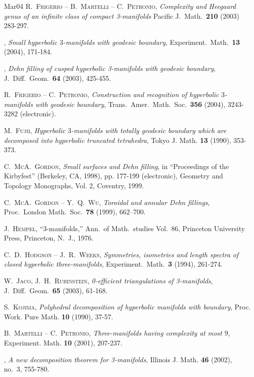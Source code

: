 \documentclass[10pt]{article}      %
\begin{document}
\begin{thebibliography}{Mar04}
 \textsc{R.~Frigerio -- B.~Martelli -- C.~Petronio},
\emph{Complexity and Heegaard genus of an infinite class of compact 3-manifolds}
Pacific J.~Math.~\textbf{210} (2003) 283-297.

 \bysame,
\emph{Small hyperbolic $3$-manifolds with geodesic boundary},
Experiment.~Math.~\textbf{13} (2004), 171-184.

 \bysame,
\emph{Dehn filling of cusped hyperbolic 3-manifolds with geodesic boundary},
J.~Diff.~Geom.~\textbf{64} (2003), 425-455.

 \textsc{R.~Frigerio -- C.~Petronio},
\emph{Construction and recognition of hyperbolic $3$-manifolds
with geodesic boundary},  
Trans.~Amer.~Math.~Soc.~\textbf{356} (2004), 3243-3282 (electronic).

\textsc{M.~Fujii}, \textit{Hyperbolic $3$-manifolds 
with totally geodesic
boundary which are decomposed into hyperbolic truncated tetrahedra},
Tokyo J. Math. \textbf{13} (1990), 353-373.  

\textsc{C.~McA.~Gordon}, 
\emph{Small surfaces and Dehn filling}, in
``Proceedings of the Kirbyfest'' (Berkeley, CA, 1998), pp. 177-199 (electronic), 
Geometry and Topology Monographs, Vol. 2, Coventry, 1999. 

 \textsc{C.~McA.~Gordon -- Y.~Q.~Wu},
\emph{Toroidal and annular Dehn fillings}, Proc.~London
Math.~Soc.~\textbf{78} (1999), 662--700.

 \textsc{J.~Hempel},
``$3$-manifolds,'' Ann.~of Math.~studies Vol.~86, 
Princeton University Press, Princeton, N.~J., 1976.

 \textsc{C.~D.~Hodgson -- J.~R.~Weeks},
\emph{Symmetries, isometries and length spectra of closed hyperbolic
    three-manifolds}, Experiment.~Math.~\textbf{3} (1994), 261-274.

 \textsc{W.~Jaco, J.~H.~Rubinstein},
\emph{0-efficient triangulations of 3-manifolds},
J.~Diff.~Geom.~\textbf{65} (2003), 61-168.

 \textsc{S.~Kojima},
\textit{Polyhedral decomposition of hyperbolic manifolds with
boundary},
Proc. Work. Pure Math. \textbf{10} (1990), 37-57.

 \textsc{B.~Martelli -- C.~Petronio},
  \emph{Three-manifolds having complexity at most $9$}, Experiment.
  Math. \textbf{10} (2001), 207-237.

 \bysame,
  \emph{A new decomposition theorem for 3-manifolds}, Illinois J. Math.
  \textbf{46} (2002), no.~3, 755-780.


\end{thebibliography}
\end{document}
